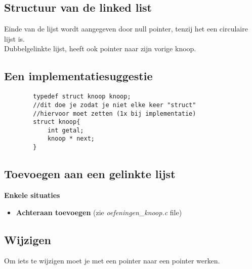 \documentclass{article}
\begin{document}
\subsection{Structuur van de linked list}
Einde van de lijst wordt aangegeven door null pointer, tenzij het een circulaire lijst is.
\\
Dubbelgelinkte lijst, heeft ook pointer naar zijn vorige knoop.
\subsection{Een implementatiesuggestie}
    \begin{lstlisting}
        typedef struct knoop knoop;
        //dit doe je zodat je niet elke keer "struct"
        //hiervoor moet zetten (1x bij implementatie)
        struct knoop{
            int getal;
            knoop * next; 
        }
    \end{lstlisting}
\subsection{Toevoegen aan een gelinkte lijst}
    \textbf{Enkele situaties}
    \begin{itemize}
        \item \textbf{Achteraan toevoegen} (zie \textit{oefeningen_knoop.c} file)
    \end{itemize}
\subsection{Wijzigen}
    Om iets te wijzigen moet je met een pointer naar een pointer werken.
\end{document}
